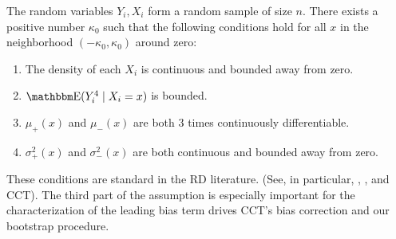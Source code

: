 \documentclass[12pt,fleqn]{article}
\begin{document}
\begin{assumption}\label{A1}
  The random variables $Y_i, X_i$ form a random sample of size $n$.
  There exists a positive number $\kappa_0$ such that the following
  conditions hold for all $x$ in the neighborhood $(-\kappa_{0},\kappa_{0})$
  around zero:
  \begin{enumerate}
  \item The density of each $X_i$ is continuous and bounded away from zero.
  \item $\E(Y_{i}^{4} \mid X_{i}=x)$ is bounded.
  \item $\mu_+(x)$ and $\mu_-(x)$ are both 3 times continuously differentiable.
  \item $\sigma_+^2(x)$ and $\sigma_-^2(x)$ are both continuous and bounded away
    from zero.
 \end{enumerate}
\end{assumption}

These conditions are standard in the RD literature. (See, in particular,
\citealp{HTV2001}, \citealp{Porter03}, and CCT). The third part of the
assumption is especially important for the characterization of the leading bias
term drives CCT's bias correction and our bootstrap procedure.
\end{document}
